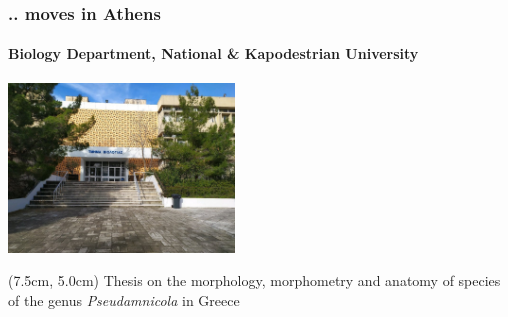 \documentclass{beamer}
\begin{document}
   \begin{frame}
      \frametitle{.. moves in Athens}
      \framesubtitle{Biology Department, National \& Kapodestrian University}
      \includegraphics[width=60mm]{resources/biol_depart_ekpa.jpg} 
      \begin{textblock*}{5cm}(7.5cm, 5.0cm)
         \small Thesis on the morphology, morphometry and anatomy of species of the genus \textit{Pseudamnicola} in Greece
      \end{textblock*}
   \end{frame}
\end{document}
